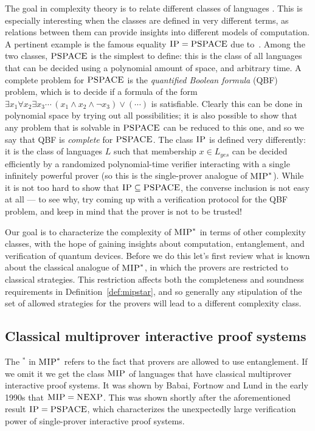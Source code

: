 The goal in complexity theory is to relate different classes of languages . This is especially interesting when the classes are defined in very different terms, as relations between them can provide insights into different models of computation. A pertinent example is the famous equality $\textsc{IP} = \textsc{PSPACE}$ due to~\cite{lund1992algebraic,shamir1992ip}. Among the two classes, $\textsc{PSPACE}$ is the simplest to define: this is the class of all languages that can be decided using a polynomial amount of space, and arbitrary time. A complete problem for $\textsc{PSPACE}$ is the \emph{quantified Boolean formula} (QBF) problem, which is to decide if a formula of the form $\exists x_1 \forall x_2 \exists x_3\cdots  \, (x_1 \wedge x_2 \wedge \neg x_3) \vee (\cdots)$ is satisfiable. Clearly this can be done in polynomial space by trying out all possibilities; it is also possible to show that any problem that is solvable in $\textsc{PSPACE}$ can be reduced to this one, and so we say that QBF is \emph{complete} for $\textsc{PSPACE}$. The class $\textsc{IP}$ is defined very differently: it is the class of languages $L$ such that membership $x\in L_{yes}$ can be decided efficiently by a randomized polynomial-time verifier interacting with a single infinitely powerful prover (so this is the single-prover analogue of $\textsc{MIP}^*$).  While it is not too hard to show that $\textsc{IP} \subseteq \textsc{PSPACE}$, the converse inclusion is not easy at all --- to see why, try coming up with a verification protocol for the QBF problem, and keep in mind that the prover is not to be trusted!

Our goal is to characterize the complexity of $\textsc{MIP}^*$ in terms of other complexity classes, with the hope of gaining insights about computation, entanglement, and verification of quantum devices. Before we do this let's first review what is known about the classical analogue of $\textsc{MIP}^*$, in which the provers are restricted to classical strategies.  This restriction affects both the completeness and soundness requirements in Definition~\ref{def:mipstar}, and so generally any stipulation of the set of allowed strategies for the provers will lead to a different complexity class. 


\subsection{Classical multiprover interactive proof systems}
\label{sec:classical-mip}

The $^*$ in $\textsc{MIP}^*$ refers to the fact that provers are allowed to use entanglement. If we omit it we get the class $\textsc{MIP}$ of languages that have classical multiprover interactive proof systems. It was shown by Babai, Fortnow and Lund in the early 1990s that $\textsc{MIP} =  \textsc{NEXP}$. This was shown shortly after the aforementioned result $\textsc{IP} = \textsc{PSPACE}$, which characterizes the unexpectedly large verification power of single-prover interactive proof systems.  

